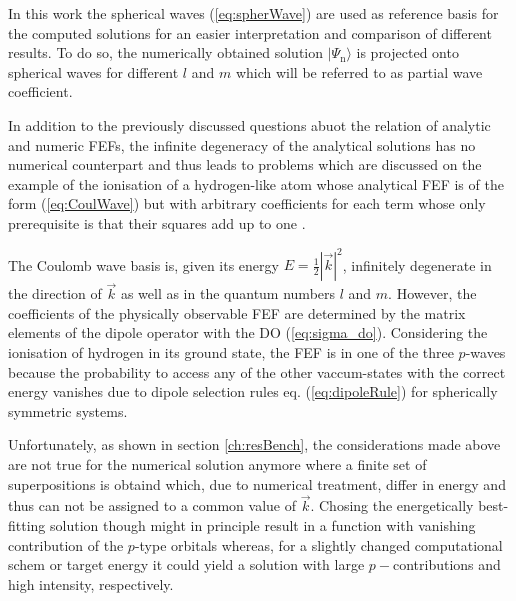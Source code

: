 In this work the spherical waves (\ref{eq:spherWave}) are used as reference basis for the computed solutions for an easier interpretation and comparison of different results.
To do so, the numerically obtained solution $|\Psi_\text{n}\rangle$ is projected onto spherical waves for different $l$ and $m$ which will be referred to as partial wave coefficient.

In addition to the previously discussed questions abuot the relation of analytic and numeric FEFs, the infinite degeneracy of the analytical solutions has no numerical counterpart and thus leads to problems which are discussed on the example of the ionisation of a hydrogen-like atom whose analytical FEF is of the form (\ref{eq:CoulWave}) but with arbitrary coefficients for each term whose only prerequisite is that their squares add up to one \cite{Lifschitz}.
%

The Coulomb wave basis is, given its energy $E=\frac 12 |\vec{k}|^2$, infinitely degenerate in the direction of $\vec{k}$ as well as in the quantum numbers $l$ and $m$.
However, the coefficients of the physically observable FEF are determined by the matrix elements of the dipole operator with the DO (\ref{eq:sigma_do}).  
Considering the ionisation of hydrogen in its ground state, the FEF is in one of the three $p$-waves because the probability to access any of the other vaccum-states with the correct energy vanishes due to dipole selection rules eq. (\ref{eq:dipoleRule}) for spherically symmetric systems.

Unfortunately, as shown in section \ref{ch:resBench}, the considerations made above are not true for the numerical solution anymore where a finite set of superpositions is obtaind which, due to numerical treatment, differ in energy and thus can not be assigned to a common value of $\vec{k}$.
Chosing the energetically best-fitting solution though might in principle result in a function with vanishing contribution of the $p$-type orbitals whereas, for a slightly changed computational schem or target energy it could yield a solution with large $p-$contributions and high intensity, respectively.

